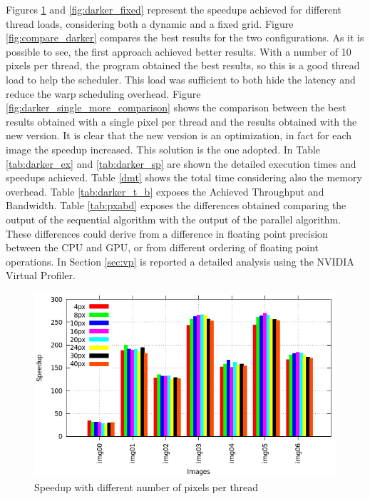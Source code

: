 \documentclass[a4paper]{article}
\begin{document}
Figures \ref{fig:darker_try_histo} and \ref{fig:darker_fixed} represent the speedups achieved for different thread loads, considering both a dynamic and a fixed grid. Figure \ref{fig:compare_darker} compares the best results for the two configurations. As it is possible to see, the first approach achieved better results. With a number of 10 pixels per thread, the program obtained the best results, so this is a good thread load to help the scheduler. This load was sufficient to both hide the latency and reduce the warp scheduling overhead. Figure \ref{fig:darker_single_more_comparison} shows the comparison between the best results obtained with a single pixel per thread and the results obtained with the new version. It is clear that the new version is an optimization, in fact for each image the speedup increased. This solution is the one adopted. In Table \ref{tab:darker_ex} and \ref{tab:darker_sp} are shown the detailed execution times and speedups achieved. Table \ref{dmt} shows the total time considering also the memory overhead. Table \ref{tab:darker_t_b} exposes the Achieved Throughput and Bandwidth. Table \ref{tab:pxabd} exposes the differences obtained comparing the output of the sequential algorithm with the output of the parallel algorithm. These differences could derive from a difference in floating point precision between the CPU and GPU, or from different ordering of floating point operations. In Section \ref{sec:vp} is reported a detailed analysis using the NVIDIA Virtual Profiler.
    
\begin{figure}[!ht]
    \centering
    \includegraphics[width=0.8\linewidth]{res/new/darker_try_histo}
    \caption{Speedup with different number of pixels per thread}
    \label{fig:darker_try_histo}
\end{figure}
\FloatBarrier
\end{document}
